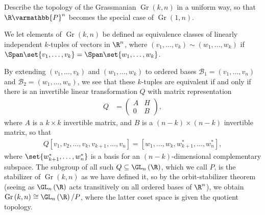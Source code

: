 \documentclass[10pt]{mypackage}
\renewcommand*{\mathbb}[1]{\varmathbb{#1}}
\begin{document}
\RaggedRight
\begin{problem}[Problem 1]
  Describe the topology of the Grassmanian $\operatorname{Gr}\left( k,n \right)$ in a uniform way, so that $\R\mathbb{P}^n$ becomes the special case of $\operatorname{Gr}\left( 1,n \right)$.
\end{problem}
\begin{solution}
We let elements of $\operatorname{Gr}\left( k,n \right)$ be defined as equivalence classes of linearly independent $k$-tuples of vectors in $\R^n$, where $\left( v_1,\dots,v_k \right) \sim \left( w_1,\dots,w_k \right)$ if $\Span \set{v_1,\dots,v_k} = \Span\set{w_1,\dots,w_k} $.\newline

By extending $\left( v_1,\dots,v_k \right)$ and $\left( w_1,\dots,w_k \right)$ to ordered bases $\mathcal{B}_1 = \left( v_1,\dots,v_n \right)$ and $\mathcal{B}_2 = \left( w_1,\dots,w_n \right)$, we see that these $k$-tuples are equivalent if and only if there is an invertible linear transformation $Q$ with matrix representation
\begin{align*}
  Q &= \begin{pmatrix}A & H \\ 0 & B\end{pmatrix},
\end{align*}
where $A$ is a $k\times k$ invertible matrix, and $B$ is a $\left( n-k \right)\times \left( n-k \right)$ invertible matrix, so that 
\begin{align*}
    Q \left[ v_1,v_2,\dots,v_k,v_{k+1},\dots,v_n \right] = \left[ w_1,\dots,w_k,w^{\ast}_{k+1},\dots,w_n^{\ast} \right],
\end{align*}
where $\set{w_{k+1}^{\ast},\dots,w_n^{\ast}}$ is a basis for an $\left( n-k \right)$-dimensional complementary subspace. The subgroup of all such $Q\subseteq \GL_n\left( \R \right)$, which we call $P$, is the stabilizer of $\operatorname{Gr}\left( k,n \right)$ as we have defined it, so by the orbit-stabilizer theorem (seeing as $\GL_n\left( \R \right)$ acts transitively on all ordered bases of $\R^n$), we obtain $\operatorname{Gr}\left( k,n \right)\cong \GL_n\left( \R \right)/P$, where the latter coset space is given the quotient topology.\newline


\end{solution}
\end{document}
